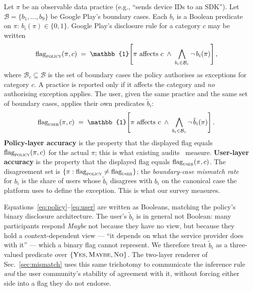 \documentclass[11pt,a4paper]{article}
\begin{document}
Let $\pi$ be an observable data practice (e.g., ``sends device IDs to
an SDK''). Let $\mathcal{B}=\{b_1,\ldots,b_9\}$ be Google Play's
boundary cases. Each $b_i$ is a Boolean predicate on
$\pi$: $b_i(\pi)\in\{0,1\}$. Google Play's disclosure rule for a
category $c$ may be written
\begin{equation}\label{eq:policy}
\textrm{flag}_\textsc{policy}(\pi,c) \;=\; \mathbb{1}\!\left[\pi
\text{ affects }c \;\wedge\; \bigwedge_{b_i\in \mathcal{B}_c}
\lnot\, b_i(\pi)\right],
\end{equation}
where $\mathcal{B}_c\subseteq\mathcal{B}$ is the set of boundary
cases the policy authorises as exceptions for category $c$. A
practice is reported only if it affects the category and \emph{no}
authorising exception applies. The user, given the same practice and
the same set of boundary cases, applies their own predicates
$\tilde{b}_i$:
\begin{equation}\label{eq:user}
\textrm{flag}_\textsc{user}(\pi,c) \;=\; \mathbb{1}\!\left[\pi
\text{ affects }c \;\wedge\; \bigwedge_{b_i\in \mathcal{B}_c}
\lnot\, \tilde{b}_i(\pi)\right].
\end{equation}
\textbf{Policy-layer accuracy} is the property that the displayed
flag equals $\textrm{flag}_\textsc{policy}(\pi,c)$ for the actual
$\pi$; this is what existing audits~\citep{koch:etal:2022,
kollnig:etal:2022,khandelwal:etal:2023} measure. \textbf{User-layer
accuracy} is the property that the displayed flag equals
$\textrm{flag}_\textsc{user}(\pi,c)$. The disagreement set is
$\{\pi : \textrm{flag}_\textsc{policy} \neq
\textrm{flag}_\textsc{user}\}$; the \emph{boundary-case mismatch
rate} for $b_i$ is the share of users whose $\tilde{b}_i$ disagrees
with $b_i$ on the canonical case the platform uses to define the
exception. This is what our survey measures.

Equations~\ref{eq:policy}--\ref{eq:user} are written as Booleans,
matching the policy's binary disclosure architecture. The user's
$\tilde{b}_i$ is in general not Boolean: many participants respond
\emph{Maybe} not because they have no view, but because they hold a
context-dependent view --- ``it depends on what the service provider
does with it'' --- which a binary flag cannot represent. We
therefore treat $\tilde{b}_i$ as a three-valued predicate over
$\{\textsc{Yes},\textsc{Maybe},\textsc{No}\}$. The two-layer
renderer of Sec.~\ref{sec:mismatch} uses this same trichotomy to
communicate the inference rule \emph{and} the user community's
stability of agreement with it, without forcing either side into a
flag they do not endorse.
\end{document}
